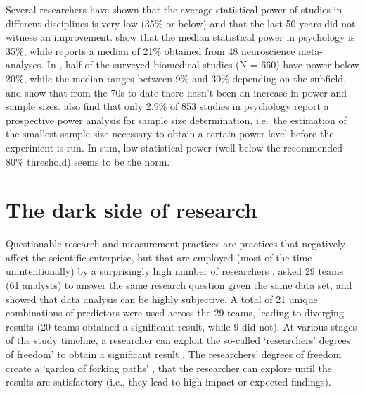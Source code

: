\documentclass[12pt,a4paper,]{article}
\begin{document}
Several researchers have shown that the average statistical power of
studies in different disciplines is very low (35\% or below) and that
the last 50 years did not witness an improvement. \citet{bakker2012}
show that the median statistical power in psychology is 35\%, while
\citet{button2013} reports a median of 21\% obtained from 48
neuroscience meta-analyses. In \citet{dumas-mallet2017}, half of the
surveyed biomedical studies (N = 660) have power below 20\%, while the
median ranges between 9\% and 30\% depending on the subfield.
\citet{rossi1990} and \citet{marszalek2011} show that from the 70s to
date there hasn't been an increase in power and sample sizes.
\citet{tressoldi2015} also find that only 2.9\% of 853 studies in
psychology report a prospective power analysis for sample size
determination, i.e.~the estimation of the smallest sample size necessary
to obtain a certain power level before the experiment is run. In sum,
low statistical power (well below the recommended 80\% threshold) seems
to be the norm.

\hypertarget{the-dark-side-of-research}{%
\section{The dark side of research}\label{the-dark-side-of-research}}

Questionable research and measurement practices are practices that
negatively affect the scientific enterprise, but that are employed (most
of the time unintentionally) by a surprisingly high number of
researchers \citep{john2012}. \citet{silberzahn2018} asked 29 teams (61
analysts) to answer the same research question given the same data set,
and showed that data analysis can be highly subjective. A total of 21
unique combinations of predictors were used across the 29 teams, leading
to diverging results (20 teams obtained a significant result, while 9
did not). At various stages of the study timeline, a researcher can
exploit the so-called `researchers' degrees of freedom' to obtain a
significant result \citep{simmons2011}. The researchers' degrees of
freedom create a `garden of forking paths' \citep{gelman2013}, that the
researcher can explore until the results are satisfactory (i.e., they
lead to high-impact or expected findings).
\end{document}
